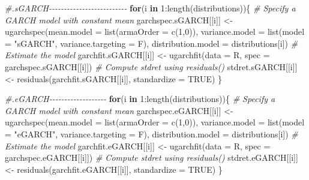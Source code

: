 \documentclass[a4paper, twoside]{templates/ociamthesis}
\newenvironment{Shaded}{\begin{snugshade}}{\end{snugshade}}
\newcommand{\AttributeTok}[1]{\textcolor[rgb]{0.77,0.63,0.00}{#1}}
\newcommand{\CommentTok}[1]{\textcolor[rgb]{0.56,0.35,0.01}{\textit{#1}}}
\newcommand{\ConstantTok}[1]{\textcolor[rgb]{0.00,0.00,0.00}{#1}}
\newcommand{\ControlFlowTok}[1]{\textcolor[rgb]{0.13,0.29,0.53}{\textbf{#1}}}
\newcommand{\DecValTok}[1]{\textcolor[rgb]{0.00,0.00,0.81}{#1}}
\newcommand{\FunctionTok}[1]{\textcolor[rgb]{0.00,0.00,0.00}{#1}}
\newcommand{\NormalTok}[1]{#1}
\newcommand{\OtherTok}[1]{\textcolor[rgb]{0.56,0.35,0.01}{#1}}
\newcommand{\SpecialCharTok}[1]{\textcolor[rgb]{0.00,0.00,0.00}{#1}}
\newcommand{\StringTok}[1]{\textcolor[rgb]{0.31,0.60,0.02}{#1}}
\renewenvironment{Shaded}
{
  \vspace{10pt}%
  \begin{snugshade}%
}{%
  \end{snugshade}%
  \vspace{8pt}%
}
\begin{document}
\begin{Shaded}
\begin{Highlighting}[]
\CommentTok{\#.sGARCH{-}{-}{-}{-}{-}{-}{-}{-}{-}{-}{-}{-}{-}{-}{-}{-}{-}{-}{-}{-}{-}{-}{-}{-}{-}{-}}
\ControlFlowTok{for}\NormalTok{(i }\ControlFlowTok{in} \DecValTok{1}\SpecialCharTok{:}\FunctionTok{length}\NormalTok{(distributions))\{}
\CommentTok{\# Specify a GARCH model with constant mean}
\NormalTok{garchspec.sGARCH[[i]] }\OtherTok{\textless{}{-}} \FunctionTok{ugarchspec}\NormalTok{(}\AttributeTok{mean.model =} \FunctionTok{list}\NormalTok{(}\AttributeTok{armaOrder =} \FunctionTok{c}\NormalTok{(}\DecValTok{1}\NormalTok{,}\DecValTok{0}\NormalTok{)),}
                     \AttributeTok{variance.model =} \FunctionTok{list}\NormalTok{(}\AttributeTok{model =} \StringTok{"sGARCH"}\NormalTok{, }\AttributeTok{variance.targeting =}\NormalTok{ F), }
                     \AttributeTok{distribution.model =}\NormalTok{ distributions[i])}
\CommentTok{\# Estimate the model}
\NormalTok{garchfit.sGARCH[[i]] }\OtherTok{\textless{}{-}} \FunctionTok{ugarchfit}\NormalTok{(}\AttributeTok{data =}\NormalTok{ R, }\AttributeTok{spec =}\NormalTok{ garchspec.sGARCH[[i]])}
\CommentTok{\# Compute stdret using residuals()}
\NormalTok{stdret.sGARCH[[i]] }\OtherTok{\textless{}{-}} \FunctionTok{residuals}\NormalTok{(garchfit.sGARCH[[i]], }\AttributeTok{standardize =} \ConstantTok{TRUE}\NormalTok{)}
\NormalTok{\}}

\CommentTok{\#.eGARCH{-}{-}{-}{-}{-}{-}{-}{-}{-}{-}{-}{-}{-}{-}{-}{-}{-}{-}{-}}
\ControlFlowTok{for}\NormalTok{(i }\ControlFlowTok{in} \DecValTok{1}\SpecialCharTok{:}\FunctionTok{length}\NormalTok{(distributions))\{}
\CommentTok{\# Specify a GARCH model with constant mean}
\NormalTok{garchspec.eGARCH[[i]] }\OtherTok{\textless{}{-}} \FunctionTok{ugarchspec}\NormalTok{(}\AttributeTok{mean.model =} \FunctionTok{list}\NormalTok{(}\AttributeTok{armaOrder =} \FunctionTok{c}\NormalTok{(}\DecValTok{1}\NormalTok{,}\DecValTok{0}\NormalTok{)),}
                     \AttributeTok{variance.model =} \FunctionTok{list}\NormalTok{(}\AttributeTok{model =} \StringTok{"eGARCH"}\NormalTok{, }\AttributeTok{variance.targeting =}\NormalTok{ F), }
                     \AttributeTok{distribution.model =}\NormalTok{ distributions[i])}
\CommentTok{\# Estimate the model}
\NormalTok{garchfit.eGARCH[[i]] }\OtherTok{\textless{}{-}} \FunctionTok{ugarchfit}\NormalTok{(}\AttributeTok{data =}\NormalTok{ R, }\AttributeTok{spec =}\NormalTok{ garchspec.eGARCH[[i]])}
\CommentTok{\# Compute stdret using residuals()}
\NormalTok{stdret.eGARCH[[i]] }\OtherTok{\textless{}{-}} \FunctionTok{residuals}\NormalTok{(garchfit.eGARCH[[i]], }\AttributeTok{standardize =} \ConstantTok{TRUE}\NormalTok{)}
\NormalTok{\}}


\end{Highlighting}
\end{Shaded}
\end{document}
